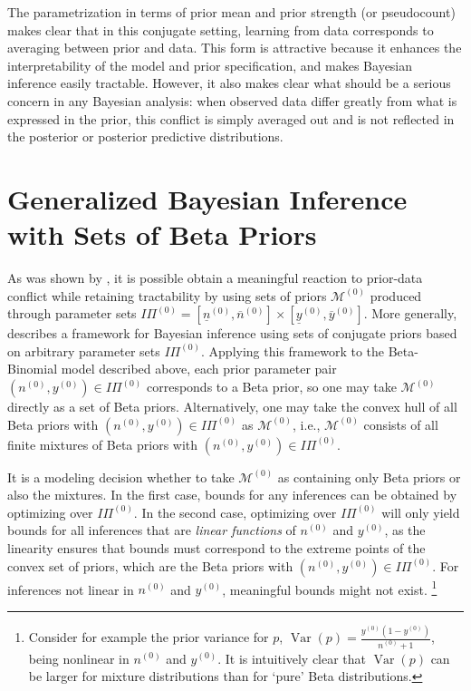 \documentclass[runningheads,a4paper]{llncs}
\newcommand{\uz}{^{(0)}} %
\newcommand{\ul}[1]{\underline{#1}}
\newcommand{\ol}[1]{\overline{#1}}
\def\yz{y\uz}
\def\yzl{\ul{y}\uz}
\def\yzu{\ol{y}\uz}
\def\nz{n\uz}
\def\nzl{\ul{n}\uz}
\def\nzu{\ol{n}\uz}
\def\PZ{I\!\!\Pi\uz}
\def\MZ{\mathcal{M}\uz}
\newcommand{\V}{\operatorname{Var}}
\begin{document}
The parametrization in terms of prior mean and prior strength (or pseudocount)
makes clear that in this conjugate setting,
learning from data corresponds to averaging between prior and data.
This form is attractive because it enhances the interpretability of the model and prior specification,
and makes Bayesian inference easily tractable.
However, it also makes clear what should be a serious concern in any Bayesian analysis:
when observed data differ greatly from what is expressed in the prior,
this conflict is simply averaged out
and is not reflected in the posterior or posterior predictive distributions.


\section{Generalized Bayesian Inference with Sets of Beta Priors}
\label{sec:setsofbetapriors}

As was shown by \cite{Walter2009a}, %
it is possible obtain a meaningful reaction to prior-data conflict while retaining tractability
by using sets of priors $\MZ$ produced through parameter sets $\PZ = [\nzl, \nzu] \times [\yzl, \yzu]$.
More generally, \cite[\S 3.1]{2013:diss-gw} describes a framework for
Bayesian inference using sets of conjugate priors based on arbitrary parameter sets $\PZ$.
Applying this framework to the Beta-Binomial model described above,
each prior parameter pair $(\nz, \yz) \in \PZ$ corresponds to a Beta prior,
so one may take $\MZ$ directly as a set of Beta priors.
Alternatively, one may take the convex hull of all Beta priors with $(\nz, \yz) \in \PZ$ as $\MZ$,
i.e., $\MZ$ consists of all finite mixtures of Beta priors with $(\nz, \yz) \in \PZ$.

It is a modeling decision whether to take $\MZ$ as containing only Beta priors or also the mixtures.
In the first case, bounds for any inferences can be obtained by optimizing over $\PZ$.
In the second case, optimizing over $\PZ$ will only yield bounds for all inferences
that are \emph{linear functions} of $\nz$ and $\yz$,
as the linearity ensures that bounds must correspond to the extreme points of the convex set of priors,
which are the Beta priors with $(\nz, \yz) \in \PZ$.
For inferences not linear in $\nz$ and $\yz$, meaningful bounds might not exist.%
\footnote{Consider for example the prior variance for $p$, $\V(p) = \frac{\yz (1-\yz)}{\nz + 1}$,
being nonlinear in $\nz$ and $\yz$.
It is intuitively clear that $\V(p)$ can be larger for mixture distributions than for `pure' Beta distributions.}
\end{document}
